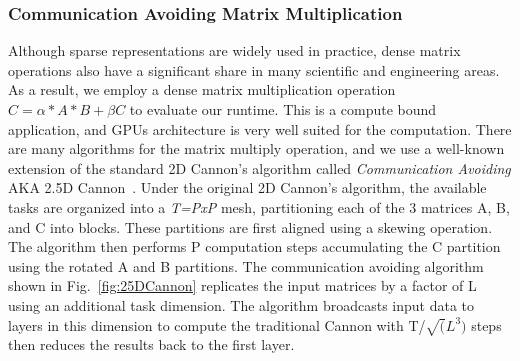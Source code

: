 \subsubsection{Communication Avoiding Matrix Multiplication}
Although sparse representations are widely used in practice, dense matrix operations also have a significant share in many scientific and engineering areas.
As a result, we employ a dense matrix multiplication operation $C = \alpha* A * B + \beta C$ to evaluate our runtime.
This is a compute bound application, and GPUs architecture is very well suited for the computation. 
There are many algorithms for the matrix multiply operation, and we use a well-known extension of the standard 2D Cannon's algorithm called {\em Communication Avoiding} AKA 2.5D Cannon~\cite{25Dcannon}. 
Under the original 2D Cannon's algorithm, the available tasks are organized into a {\em T=PxP} mesh, partitioning each of the 3 matrices A, B, and C into blocks.
These partitions are first aligned using a skewing operation.
The algorithm then performs P computation steps accumulating the C partition using the rotated A and B partitions.
The communication avoiding algorithm shown in Fig.~\ref{fig:25DCannon} replicates the input matrices by a factor of L using an additional task dimension.
The algorithm broadcasts input data to layers in this dimension to compute the traditional Cannon with T/$\sqrt(L^3)$ steps then reduces the results back to the first layer.


